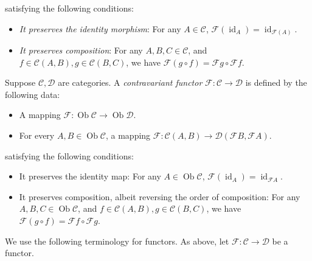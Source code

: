 satisfying the following conditions:

\begin{itemize}
\item {\em It preserves the identity morphism}: For any $A \in
  \mathcal{C}$, $\mathcal{F}(\operatorname{id}_A) =
  \operatorname{id}_{\mathcal{F}(A)}$.
\item {\em It preserves composition}: For any $A,B,C \in \mathcal{C}$,
  and $f \in \mathcal{C}(A,B), g \in \mathcal{C}(B,C)$, we have $\mathcal{F}(g
  \circ f) = \mathcal{F}g \circ \mathcal{F}f$.
\end{itemize}

Suppose $\mathcal{C}, \mathcal{D}$ are categories. A {\em contravariant
functor} $\mathcal{F}:\mathcal{C} \to \mathcal{D}$ is defined by the
following data:

\begin{itemize}
\item A mapping $\mathcal{F}: \operatorname{Ob}\mathcal{C} \to
  \operatorname{Ob}\mathcal{D}$.
\item For every $A,B \in \operatorname{Ob}\mathcal{C}$, a mapping
  $\mathcal{F}: \mathcal{C}(A,B) \to
  \mathcal{D}(\mathcal{F}B,\mathcal{F}A)$.
\end{itemize}

satisfying the following conditions:

\begin{itemize}
\item It preserves the identity map: For any $A \in
  \operatorname{Ob}\mathcal{C}$, $\mathcal{F}(\operatorname{id}_A) =
  \operatorname{id}_{\mathcal{F}A}$.
\item It preserves composition, albeit reversing the order of
  composition: For any $A,B,C \in \operatorname{Ob}\mathcal{C}$, and
  $f \in \mathcal{C}(A,B), g \in \mathcal{C}(B,C)$, we have
  $\mathcal{F}(g \circ f) = \mathcal{F}f \circ \mathcal{F}g$.
\end{itemize}

We use the following terminology for functors. As above, let
$\mathcal{F}:\mathcal{C} \to \mathcal{D}$ be a functor.

